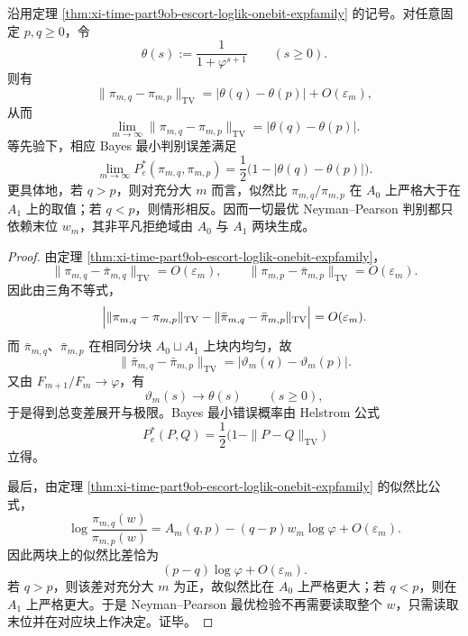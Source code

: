 \begin{corollary}\label{cor:xi-time-part9ob-escort-np-lastbit-collapse}
沿用定理 \ref{thm:xi-time-part9ob-escort-loglik-onebit-expfamily} 的记号。对任意固定 \(p,q\ge 0\)，令
\[
\theta(s):=\frac{1}{1+\varphi^{s+1}}
\qquad (s\ge 0).
\]
则有
\[
\|\pi_{m,q}-\pi_{m,p}\|_{\mathrm{TV}}
=
|\theta(q)-\theta(p)|+O(\varepsilon_m),
\]
从而
\[
\lim_{m\to\infty}\|\pi_{m,q}-\pi_{m,p}\|_{\mathrm{TV}}
=
|\theta(q)-\theta(p)|.
\]
等先验下，相应 Bayes 最小判别误差满足
\[
\lim_{m\to\infty}P_e^\ast(\pi_{m,q},\pi_{m,p})
=
\frac12\bigl(1-|\theta(q)-\theta(p)|\bigr).
\]
更具体地，若 \(q>p\)，则对充分大 \(m\) 而言，似然比 \(\pi_{m,q}/\pi_{m,p}\) 在 \(A_0\) 上严格大于在 \(A_1\) 上的取值；若 \(q<p\)，则情形相反。因而一切最优 Neyman--Pearson 判别都只依赖末位 \(w_m\)，其非平凡拒绝域由 \(A_0\) 与 \(A_1\) 两块生成。
\end{corollary}
\begin{proof}
由定理 \ref{thm:xi-time-part9ob-escort-loglik-onebit-expfamily}，
\[
\|\pi_{m,q}-\bar\pi_{m,q}\|_{\mathrm{TV}}=O(\varepsilon_m),
\qquad
\|\pi_{m,p}-\bar\pi_{m,p}\|_{\mathrm{TV}}=O(\varepsilon_m).
\]
因此由三角不等式，
\[
\Bigl|
\|\pi_{m,q}-\pi_{m,p}\|_{\mathrm{TV}}
-\|\bar\pi_{m,q}-\bar\pi_{m,p}\|_{\mathrm{TV}}
\Bigr|
=
O(\varepsilon_m).
\]
而 \(\bar\pi_{m,q}\)、\(\bar\pi_{m,p}\) 在相同分块 \(A_0\sqcup A_1\) 上块内均匀，故
\[
\|\bar\pi_{m,q}-\bar\pi_{m,p}\|_{\mathrm{TV}}
=
|\vartheta_m(q)-\vartheta_m(p)|.
\]
又由 \(F_{m+1}/F_m\to\varphi\)，有
\[
\vartheta_m(s)\to\theta(s)
\qquad (s\ge 0),
\]
于是得到总变差展开与极限。Bayes 最小错误概率由 Helstrom 公式
\[
P_e^\ast(P,Q)=\frac12\bigl(1-\|P-Q\|_{\mathrm{TV}}\bigr)
\]
立得。

最后，由定理 \ref{thm:xi-time-part9ob-escort-loglik-onebit-expfamily} 的似然比公式，
\[
\log\frac{\pi_{m,q}(w)}{\pi_{m,p}(w)}
=
A_m(q,p)-(q-p)w_m\log\varphi+O(\varepsilon_m).
\]
因此两块上的似然比差恰为
\[
(p-q)\log\varphi+O(\varepsilon_m).
\]
若 \(q>p\)，则该差对充分大 \(m\) 为正，故似然比在 \(A_0\) 上严格更大；若 \(q<p\)，则在 \(A_1\) 上严格更大。于是 Neyman--Pearson 最优检验不再需要读取整个 \(w\)，只需读取末位并在对应块上作决定。证毕。
\end{proof}

